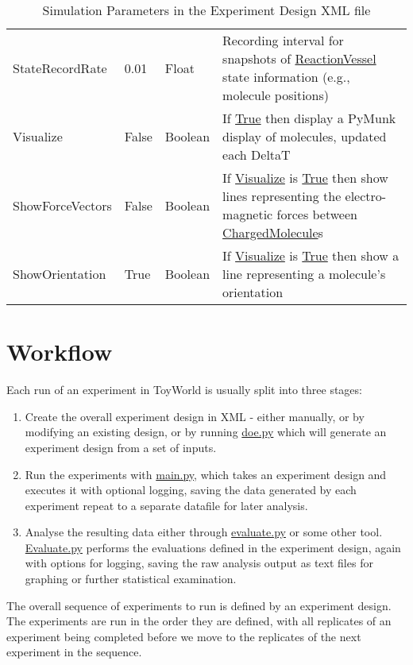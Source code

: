 \begin{sidewaystable}
\begin{center}
\begin{tabular}{@{}lllp{10cm}@{}}
StateRecordRate&0.01&Float&Recording interval for snapshots of \url{ReactionVessel} state information (e.g., molecule positions)\\
Visualize&False&Boolean&If \url{True} then display a PyMunk display of molecules, updated each DeltaT\\
ShowForceVectors&False&Boolean&If \url{Visualize} is \url{True} then show lines representing the electro-magnetic forces between \url{ChargedMolecule}s\\
ShowOrientation&True&Boolean&If \url{Visualize} is \url{True} then show a line representing a molecule's orientation\\
\bottomrule
\end{tabular}
\end{center}
\caption{Simulation Parameters in the Experiment Design XML file}
\label{tbl:simulation_parameters}
\end{sidewaystable}

\section{Workflow}\label{workflow}

Each run of an experiment in ToyWorld is usually split into three
stages:

\begin{enumerate}
\item
  Create the overall experiment design in XML - either manually, or by
  modifying an existing design, or by running \url{doe.py} which will
  generate an experiment design from a set of inputs.
\item
  Run the experiments with \url{main.py}, which takes an experiment
  design and executes it with optional logging, saving the data
  generated by each experiment repeat to a separate datafile for later
  analysis.
\item
  Analyse the resulting data either through \url{evaluate.py} or some
  other tool. \url{Evaluate.py} performs the evaluations defined in the
  experiment design, again with options for logging, saving the raw
  analysis output as text files for graphing or further statistical
  examination.
\end{enumerate}

The overall sequence of experiments to run is defined by an experiment
design. The experiments are run in the order they are defined, with all
replicates of an experiment being completed before we move to the
replicates of the next experiment in the sequence.

